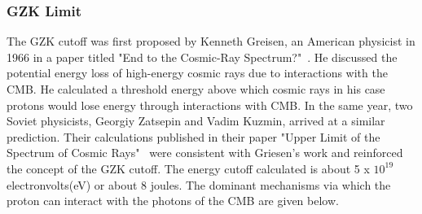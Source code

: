 \subsubsection{GZK Limit}
\label{subsubsec:GZK} 
The GZK cutoff was first proposed by Kenneth Greisen, an American physicist in 1966 in a paper titled "End to the Cosmic-Ray Spectrum?"~\cite{}. He discussed the potential energy loss of high-energy cosmic rays due to interactions with the CMB. He calculated a threshold energy above which cosmic rays in his case protons would lose energy through interactions with CMB. In the same year, two Soviet physicists, Georgiy Zatsepin and Vadim Kuzmin, arrived at a similar prediction. Their calculations published in their paper "Upper Limit of the Spectrum of Cosmic Rays"~\cite{} were consistent with Griesen's work and reinforced the concept of the GZK cutoff.  
The energy cutoff calculated is about 5 x $10^{19}$ electronvolts(eV) or about 8 joules. The dominant mechanisms via which the proton can interact with the photons of the CMB are given below. 

